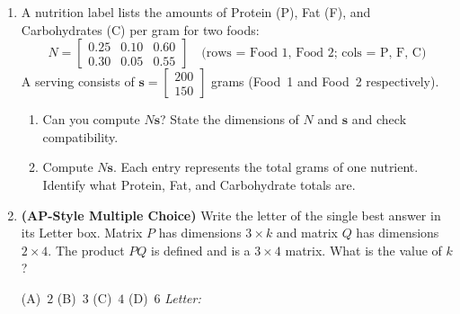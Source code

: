 \documentclass[10pt]{article}
\begin{document}
\begin{enumerate}[leftmargin=1.6em, itemsep=14pt]
\vspace{1.6in}

\item A nutrition label lists the amounts of Protein (P), Fat (F), and Carbohydrates (C)
per gram for two foods:
\[
  N = \begin{bmatrix}0.25 & 0.10 & 0.60 \\ 0.30 & 0.05 & 0.55\end{bmatrix}
  \quad \text{(rows = Food 1, Food 2; cols = P, F, C)}
\]
A serving consists of $\mathbf{s} = \begin{bmatrix}200 \\ 150\end{bmatrix}$ grams
(Food~1 and Food~2 respectively).

\begin{enumerate}[label=(\alph*), itemsep=6pt]
  \item Can you compute $N\mathbf{s}$? State the dimensions of $N$ and $\mathbf{s}$
        and check compatibility.
  \item Compute $N\mathbf{s}$. Each entry represents the total grams of one nutrient.
        Identify what Protein, Fat, and Carbohydrate totals are.
\end{enumerate}

\vspace{2.0in}

\item \textbf{(AP-Style Multiple Choice)} Write the letter of the single best answer in its Letter box. \quad
Matrix $P$ has dimensions $3 \times k$ and matrix $Q$ has dimensions $2 \times 4$.
The product $PQ$ is defined and is a $3 \times 4$ matrix.
What is the value of $k$?

\medskip
(A)~$2$ \qquad (B)~$3$ \qquad (C)~$4$ \qquad (D)~$6$ \hfill\textit{Letter:}~\gradedblank[id=hw6, type=choice, points=1, answer=A]{0.42in}{13pt}

\end{enumerate}
\end{document}

